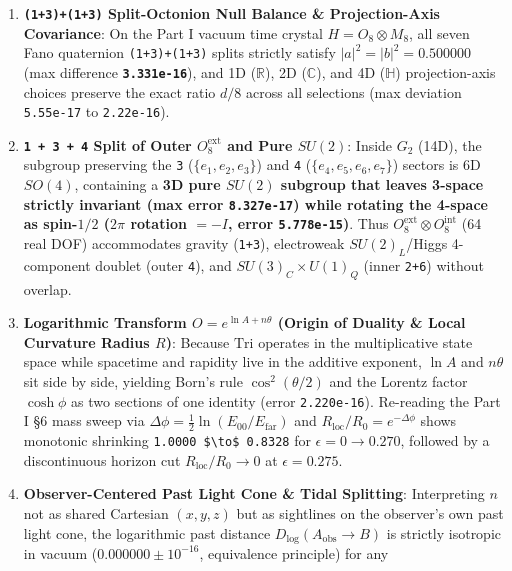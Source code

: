 \documentclass[
  a4paper,
]{article}
\providecommand{\tightlist}{%
  \setlength{\itemsep}{0pt}\setlength{\parskip}{0pt}}
\begin{document}
\begin{enumerate}
\def\labelenumi{\arabic{enumi}.}
\tightlist
\item
  \textbf{\texttt{(1+3)+(1+3)} Split-Octonion Null Balance \&
  Projection-Axis Covariance}: On the Part I vacuum time crystal
  \(H = O_8 \otimes M_8\), all seven Fano quaternion
  \texttt{(1+3)+(1+3)} splits strictly satisfy
  \(|a|^2 = |b|^2 = 0.500000\) (max difference
  \textbf{\texttt{3.331e-16}}), and 1D (\(\mathbb{R}\)), 2D
  (\(\mathbb{C}\)), and 4D (\(\mathbb{H}\)) projection-axis choices
  preserve the exact ratio \(d/8\) across all selections (max deviation
  \texttt{5.55e-17} to \texttt{2.22e-16}).
\item
  \textbf{\texttt{1\ +\ 3\ +\ 4} Split of Outer \(O_8^{\mathrm{ext}}\)
  and Pure \(SU(2)\)}: Inside \(G_2\) (14D), the subgroup preserving the
  \texttt{3} (\(\{e_1,e_2,e_3\}\)) and \texttt{4}
  (\(\{e_4,e_5,e_6,e_7\}\)) sectors is 6D \(SO(4)\), containing a
  \textbf{3D pure \(SU(2)\) subgroup that leaves 3-space strictly
  invariant (max error \texttt{8.327e-17}) while rotating the 4-space as
  spin-\(1/2\) (\(2\pi\) rotation \(= -I\), error \texttt{5.778e-15})}.
  Thus \(O_8^{\mathrm{ext}} \otimes O_8^{\mathrm{int}}\) (64 real DOF)
  accommodates gravity (\texttt{1+3}), electroweak \(SU(2)_L\)/Higgs
  4-component doublet (outer \texttt{4}), and \(SU(3)_C \times U(1)_Q\)
  (inner \texttt{2+6}) without overlap.
\item
  \textbf{Logarithmic Transform \(O = e^{\ln A + n\theta}\) (Origin of
  Duality \& Local Curvature Radius \(R\))}: Because \(\mathrm{Tri}\)
  operates in the multiplicative state space while spacetime and
  rapidity live in the additive exponent, \(\ln A\) and \(n\theta\) sit
  side by side, yielding Born's rule \(\cos^2(\theta/2)\) and the
  Lorentz factor \(\cosh\phi\) as two sections of one identity (error
  \texttt{2.220e-16}). Re-reading the Part I §6 mass sweep via
  \(\Delta\phi = \frac{1}{2}\ln(E_{00}/E_{\mathrm{far}})\) and
  \(R_{\mathrm{loc}}/R_0 = e^{-\Delta\phi}\) shows monotonic shrinking
  \texttt{1.0000\ \$\textbackslash{}to\$\ 0.8328} for
  \(\epsilon = 0 \to 0.270\), followed by a discontinuous horizon cut
  \(R_{\mathrm{loc}}/R_0 \to 0\) at \(\epsilon = 0.275\).
\item
  \textbf{Observer-Centered Past Light Cone \& Tidal Splitting}:
  Interpreting \(n\) not as shared Cartesian \((x,y,z)\) but as
  sightlines on the observer's own past light cone, the logarithmic past
  distance \(D_{\log}(A_{\mathrm{obs}}\to B)\) is strictly isotropic in
  vacuum (\(0.000000 \pm 10^{-16}\), equivalence principle) for any

\end{enumerate}
\end{document}
